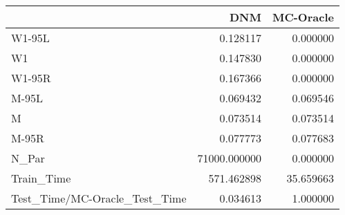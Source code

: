 \begin{tabular}{lrr}
\toprule
{} &           DNM &  MC-Oracle \\
\midrule
W1-95L                        &      0.128117 &   0.000000 \\
W1                            &      0.147830 &   0.000000 \\
W1-95R                        &      0.167366 &   0.000000 \\
M-95L                         &      0.069432 &   0.069546 \\
M                             &      0.073514 &   0.073514 \\
M-95R                         &      0.077773 &   0.077683 \\
N\_Par                         &  71000.000000 &   0.000000 \\
Train\_Time                    &    571.462898 &  35.659663 \\
Test\_Time/MC-Oracle\_Test\_Time &      0.034613 &   1.000000 \\
\bottomrule
\end{tabular}
